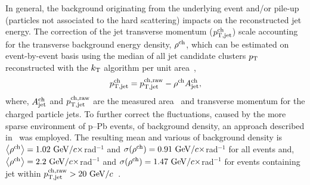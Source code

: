 In general, the background originating from the underlying event and/or pile-up (particles not associated to the hard scattering) impacts on the reconstructed jet energy.
The correction of the jet transverse momentum ($\pT[jet]^{\rm ch}$) scale accounting for the transverse background energy density, $\rho^{\rm ch}$, which can be estimated on event-by-event basis using the median of all jet candidate clusters $\pT$ reconstructed with the $k_{\rm T}$ algorithm per unit area~\cite{Cacciari:2007fd,Abelev:2013kqa},
\begin{equation}
\pT[jet]^{\rm ch}=\pT[jet]^{\rm ch,raw}-\rho^{\rm ch}A_{\rm jet}^{\rm ch},
\end{equation}
where,  $A_{\rm jet}^{\rm ch}$  and $\pT[jet]^{\rm ch,raw}$ are the measured area~\cite{Cacciari:2008gn} and transverse momentum for the charged particle jets.
To further correct the fluctuations, caused by the more sparse environment of p--Pb events, of background density, an approach described in~\cite{Chatrchyan:2012tt} was employed.
The resulting mean and various of background density is $\left\langle \rho^{\rm ch}\right\rangle=1.02~{\rm GeV/}c\times$rad$^{-1}$ and $\sigma(\rho^{\rm ch})=0.91~{\rm GeV/}c\times$rad$^{-1}$ for all events and, $\left\langle \rho^{\rm ch}\right\rangle=2.2~{\rm GeV/}c\times$rad$^{-1}$ and $\sigma(\rho^{\rm ch})=1.47~{\rm GeV/}c\times$rad$^{-1}$ for events containing jet within $\pT[jet]^{\rm ch,raw}>20~\GeVc$~\cite{Adam:2015hoa}.
